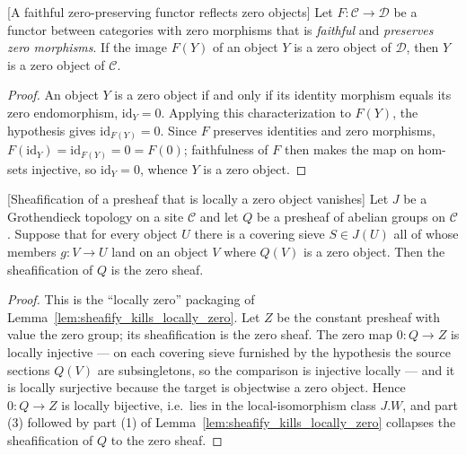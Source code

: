 \begin{lemma}

[A faithful zero-preserving functor reflects zero objects]
  \label{lem:isZero_of_faithful_preservesZeroMorphisms}
  Let \(F : \mathcal{C} \to \mathcal{D}\) be a functor between categories with zero
  morphisms that is \emph{faithful} and \emph{preserves zero morphisms}. If the image
  \(F(Y)\) of an object \(Y\) is a zero object of \(\mathcal{D}\), then \(Y\) is a zero
  object of \(\mathcal{C}\).
\end{lemma}
\begin{proof}

  An object \(Y\) is a zero object if and only if its identity morphism equals its zero
  endomorphism, \(\mathrm{id}_Y = 0\). Applying this characterization to \(F(Y)\), the
  hypothesis gives \(\mathrm{id}_{F(Y)} = 0\). Since \(F\) preserves identities and zero
  morphisms, \(F(\mathrm{id}_Y) = \mathrm{id}_{F(Y)} = 0 = F(0)\); faithfulness of \(F\)
  then makes the map on hom-sets injective, so \(\mathrm{id}_Y = 0\), whence \(Y\) is a
  zero object.
\end{proof}

\begin{lemma}

[Sheafification of a presheaf that is locally a zero object vanishes]
  \label{lem:isZero_presheafToSheaf_of_locally_isZero}
  Let \(J\) be a Grothendieck topology on a site \(\mathcal{C}\) and let \(Q\) be a
  presheaf of abelian groups on \(\mathcal{C}\). Suppose that for every object \(U\) there
  is a covering sieve \(S \in J(U)\) all of whose members \(g : V \to U\) land on an object
  \(V\) where \(Q(V)\) is a zero object. Then the sheafification of \(Q\) is the zero
  sheaf.
\end{lemma}
\begin{proof}
  This is the ``locally zero'' packaging of
  Lemma~\ref{lem:sheafify_kills_locally_zero}. Let \(Z\) be the constant presheaf with
  value the zero group; its sheafification is the zero sheaf. The zero map \(0 : Q \to Z\)
  is locally injective --- on each covering sieve furnished by the hypothesis the source
  sections \(Q(V)\) are subsingletons, so the comparison is injective locally --- and it
  is locally surjective because the target is objectwise a zero object. Hence
  \(0 : Q \to Z\) is locally bijective, i.e.\ lies in the local-isomorphism class
  \(J.W\), and part (3) followed by part (1) of
  Lemma~\ref{lem:sheafify_kills_locally_zero} collapses the sheafification of \(Q\) to the
  zero sheaf.
\end{proof}

